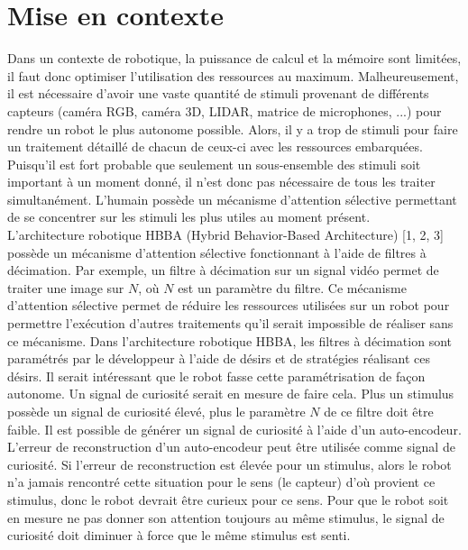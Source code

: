 \section{Mise en contexte}
    Dans un contexte de robotique, la puissance de calcul et la mémoire sont limitées, il faut donc optimiser l'utilisation des ressources au maximum. Malheureusement, il est nécessaire d’avoir une vaste quantité de stimuli provenant de différents capteurs (caméra RGB, caméra 3D, LIDAR, matrice de microphones, ...) pour rendre un robot le plus autonome possible. Alors, il y a trop de stimuli pour faire un traitement détaillé de chacun de ceux-ci avec les ressources embarquées. Puisqu’il est fort probable que seulement un sous-ensemble des stimuli soit important à un moment donné, il n’est donc pas nécessaire de tous les traiter simultanément. L’humain possède un mécanisme d’attention sélective permettant de se concentrer sur les stimuli les plus utiles au moment présent.\\
    
    L’architecture robotique HBBA (Hybrid Behavior-Based Architecture)  [1, 2, 3] possède un mécanisme d’attention sélective fonctionnant à l’aide de filtres à décimation. Par exemple, un filtre à décimation sur un signal vidéo permet de traiter une image sur \(N\), où \(N\) est un paramètre du filtre. Ce mécanisme d’attention sélective permet de réduire les ressources utilisées sur un robot pour permettre l’exécution d’autres traitements qu’il serait impossible de réaliser sans ce mécanisme. Dans l’architecture robotique HBBA, les filtres à décimation sont paramétrés par le développeur à l'aide de désirs et de stratégies réalisant ces désirs. Il serait intéressant que le robot fasse cette paramétrisation de façon autonome. Un signal de curiosité serait en mesure de faire cela. Plus un stimulus possède un signal de curiosité élevé, plus le paramètre \(N\) de ce filtre doit être faible. Il est possible de  générer un signal de curiosité à l’aide d’un auto-encodeur. L’erreur de reconstruction d’un auto-encodeur peut être utilisée comme signal de curiosité. Si l'erreur de reconstruction est élevée pour un stimulus, alors le robot n'a jamais rencontré cette situation pour le sens (le capteur) d’où provient ce stimulus, donc le robot devrait être curieux pour ce sens. Pour que le robot soit en mesure ne pas donner son attention toujours au même stimulus, le signal de curiosité doit diminuer à force que le même stimulus est senti.\\
    
